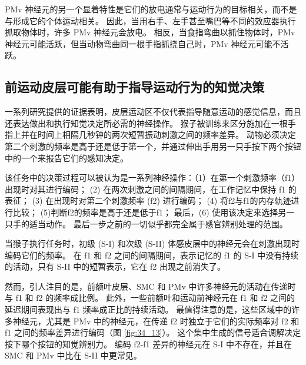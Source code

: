PMv 神经元的另一个显着特性是它们的放电通常与运动行为的目标相关，而不是与形成它的个体运动相关。 因此，当用右手、左手甚至嘴巴等不同的效应器执行抓取物体时，许多 PMv 神经元会放电。 相反，当食指弯曲以抓住物体时，PMv 神经元可能活跃，但当动物弯曲同一根手指抓挠自己时，PMv 神经元可能不活跃。


\subsection{前运动皮层可能有助于指导运动行为的知觉决策}
一系列研究提供的证据表明，皮层运动区不仅代表指导随意运动的感觉信息，而且还表达做出和执行知觉决定所必需的神经操作。 猴子被训练来区分施加在一根手指上并在时间上相隔几秒钟的两次短暂振动刺激之间的频率差异。 动物必须决定第二个刺激的频率是高于还是低于第一个，并通过伸出手用另一只手按下两个按钮中的一个来报告它们的感知决定。

该任务中的决策过程可以被认为是一系列神经操作：（1）在第一个刺激频率（f1）出现时对其进行编码； (2) 在两次刺激之间的间隔期间，在工作记忆中保持 f1 的表征； (3) 在出现时对第二个刺激频率 (f2) 进行编码； (4) 将f2与f1的内存轨迹进行比较； (5)判断f2的频率是高于还是低于f1； 最后，(6) 使用该决定来选择另一只手的适当动作。 最后一步之前的一切似乎都完全属于感官辨别处理的范围。

当猴子执行任务时，初级 (S-I) 和次级 (S-II) 体感皮层中的神经元会在刺激出现时编码它们的频率。 在 f1 和 f2 之间的间隔期间，表示记忆的 f1 的 S-I 中没有持续的活动，只有 S-II 中的短暂表示，它在 f2 出现之前消失了。

然而，引人注目的是，前额叶皮层、SMC 和 PMv 中许多神经元的活动在传递时与 f1 和 f2 的频率成比例。 此外，一些前额叶和运动前神经元在 f1 和 f2 之间的延迟期间表现出与 f1 频率成正比的持续活动。 
最值得注意的是，这些区域中的许多神经元，尤其是 PMv 中的神经元，在传递 f2 时独立于它们的实际频率对 f2 和 f1 之间的频率差异进行编码（图 \ref{fig:34_13}）。 
这个集中生成的信号适合调解决定按下哪个按钮的知觉辨别力。 编码 f2-f1 差异的神经元在 S-I 中不存在，并且在 SMC 和 PMv 中比在 S-II 中更常见。

